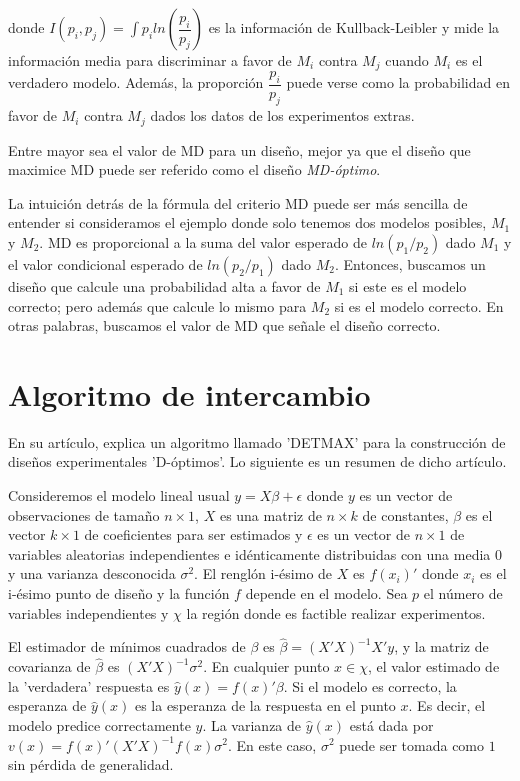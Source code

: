 donde $I(p_i, p_j) = \int p_i ln(\dfrac{p_i}{p_j})$ es la información de Kullback-Leibler y mide la información media para discriminar a favor de $M_i$ contra $M_j$ cuando $M_i$ es el verdadero modelo. Además, la proporción $\dfrac{p_i}{p_j}$ puede verse como la probabilidad en favor de $M_i$ contra $M_j$ dados los datos de los experimentos extras. 

Entre mayor sea el valor de MD para un diseño, mejor ya que el diseño que maximice MD puede ser referido como el diseño \textit{MD-óptimo}. 

La intuición detrás de la fórmula del criterio MD puede ser más sencilla de entender si consideramos el ejemplo donde solo tenemos dos modelos posibles, $M_1$ y $M_2$. MD es proporcional a la suma del valor esperado de $ln(p_1/p_2)$ dado $M_1$ y el valor condicional esperado de  $ln(p_2/p_1)$ dado $M_2$. Entonces, buscamos un diseño que calcule una probabilidad alta a favor de $M_1$ si este es el modelo correcto; pero además que calcule lo mismo para $M_2$ si es el modelo correcto. En otras palabras, buscamos el valor de MD que señale el diseño correcto. 

\section{Algoritmo de intercambio}
En su artículo, \cite{mitchelldetmax} explica un algoritmo llamado 'DETMAX' para la construcción de diseños experimentales 'D-óptimos'. Lo siguiente es un resumen de dicho artículo. 

Consideremos el modelo lineal usual $y = X \beta + \epsilon$ donde $y$ es un vector de observaciones de tamaño $n \times 1$, $X$ es una matriz de $n \times k$ de constantes, $\beta$ es el vector $k \times 1$ de coeficientes para ser estimados y $\epsilon$ es un vector de $n \times 1$ de variables aleatorias independientes e idénticamente distribuidas con una media $0$ y una varianza desconocida $\sigma^{2}$. El renglón i-ésimo de $X$ es $f(x_i)'$ donde $x_i$ es el i-ésimo punto de diseño y la función $f$ depende en el modelo. Sea $p$ el número de variables independientes y $\chi$ la región donde es factible realizar experimentos.

El estimador de mínimos cuadrados de $\beta$ es $\hat{\beta} = (X'X)^{-1} X'y$, y la matriz de covarianza de $\hat{\beta}$ es $(X'X)^{-1} \sigma^{2}$. En cualquier punto $x \in \chi$, el valor estimado de la 'verdadera' respuesta es $\hat{y} (x) = f(x)' \beta$. Si el modelo es correcto, la esperanza de $\hat{y}(x)$ es la esperanza de la respuesta en el punto $x$. Es decir, el modelo predice correctamente $y$. La varianza de $\hat{y}(x)$ está dada por $v(x) = f(x)' (X'X)^{-1} f(x) \sigma^{2}$. En este caso, $\sigma^{2}$ puede ser tomada como $1$ sin pérdida de generalidad. 

